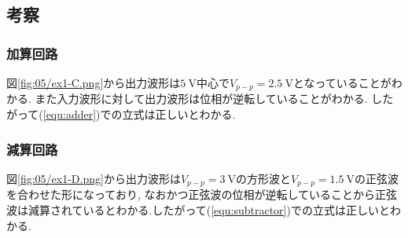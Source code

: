 \subsection{考察}
\subsubsection{加算回路}
図\ref{fig:05/ex1-C.png}から出力波形は$5\ \si{\volt}$中心で$V_{p-p}=2.5\ \si{\volt}$となっていることがわかる.
また入力波形に対して出力波形は位相が逆転していることがわかる.
したがって(\ref{equ:adder})での立式は正しいとわかる.
\subsubsection{減算回路}
図\ref{fig:05/ex1-D.png}から出力波形は$V_{p-p}=3\ \si{\volt}$の方形波と$V_{p-p}=1.5\ \si{\volt}$の正弦波を合わせた形になっており,
なおかつ正弦波の位相が逆転していることから正弦波は減算されているとわかる.したがって(\ref{equ:subtractor})での立式は正しいとわかる.